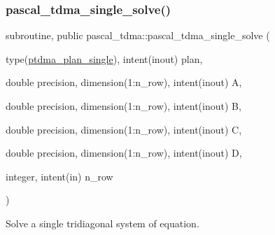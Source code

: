 \subsubsection{\texorpdfstring{pascal\+\_\+tdma\+\_\+single\+\_\+solve()}{pascal\_tdma\_single\_solve()}}
{\footnotesize\ttfamily subroutine, public pascal\+\_\+tdma\+::pascal\+\_\+tdma\+\_\+single\+\_\+solve (\begin{DoxyParamCaption}\item[{type(\hyperlink{structpascal__tdma_1_1ptdma__plan__single}{ptdma\+\_\+plan\+\_\+single}), intent(inout)}]{plan,  }\item[{double precision, dimension(1\+:n\+\_\+row), intent(inout)}]{A,  }\item[{double precision, dimension(1\+:n\+\_\+row), intent(inout)}]{B,  }\item[{double precision, dimension(1\+:n\+\_\+row), intent(inout)}]{C,  }\item[{double precision, dimension(1\+:n\+\_\+row), intent(inout)}]{D,  }\item[{integer, intent(in)}]{n\+\_\+row }\end{DoxyParamCaption})}



Solve a single tridiagonal system of equation. 


